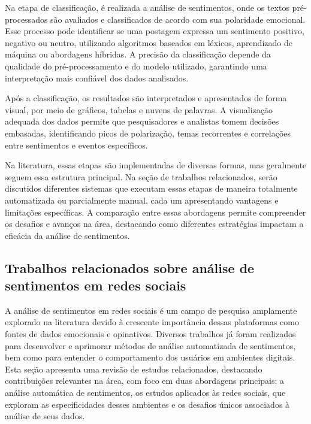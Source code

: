 \documentclass[
	12pt,				%
	oneside,			%
	a4paper,			%
	english,			%
	french,				%
	spanish,			%
	brazil				%
	]{abntex2}
\begin{document}
Na etapa de classificação, é realizada a análise de sentimentos, onde os
textos pré-processados são avaliados e classificados de acordo com sua
polaridade emocional. Esse processo pode identificar se uma postagem
expressa um sentimento positivo, negativo ou neutro, utilizando
algoritmos baseados em léxicos, aprendizado de máquina ou abordagens
híbridas. A precisão da classificação depende da qualidade do
pré-processamento e do modelo utilizado, garantindo uma interpretação
mais confiável dos dados analisados.

Após a classificação, os resultados são interpretados e apresentados de
forma visual, por meio de gráficos, tabelas e nuvens de palavras. A
visualização adequada dos dados permite que pesquisadores e analistas
tomem decisões embasadas, identificando picos de polarização, temas
recorrentes e correlações entre sentimentos e eventos específicos.

Na literatura, essas etapas são implementadas de diversas formas, mas
geralmente seguem essa estrutura principal. Na seção de trabalhos
relacionados, serão discutidos diferentes sistemas que executam essas
etapas de maneira totalmente automatizada ou parcialmente manual, cada
um apresentando vantagens e limitações específicas. A comparação entre
essas abordagens permite compreender os desafios e avanços na área,
destacando como diferentes estratégias impactam a eficácia da análise de
sentimentos.

\hypertarget{trabalhos-relacionados-sobre-anuxe1lise-de-sentimentos-em-redes-sociais}{%
\subsection{Trabalhos relacionados sobre análise de sentimentos em redes
sociais}\label{trabalhos-relacionados-sobre-anuxe1lise-de-sentimentos-em-redes-sociais}}

A análise de sentimentos em redes sociais é um campo de pesquisa
amplamente explorado na literatura devido à crescente importância dessas
plataformas como fontes de dados emocionais e opinativos. Diversos
trabalhos já foram realizados para desenvolver e aprimorar métodos de
análise automatizada de sentimentos, bem como para entender o
comportamento dos usuários em ambientes digitais. Esta seção apresenta
uma revisão de estudos relacionados, destacando contribuições relevantes
na área, com foco em duas abordagens principais: a análise automática de
sentimentos, os estudos aplicados às redes sociais, que exploram as
especificidades desses ambientes e os desafios únicos associados à
análise de seus dados.
\end{document}
